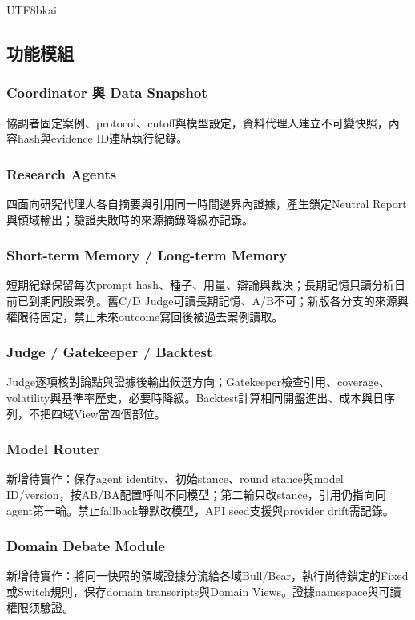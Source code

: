 \documentclass[12pt,a4paper]{article}
\begin{document}
\begin{CJK}{UTF8}{bkai}
\subsection{功能模組}

\subsubsection{Coordinator 與 Data Snapshot}
協調者固定案例、protocol、cutoff與模型設定，資料代理人建立不可變快照，內容hash與evidence ID連結執行紀錄。

\subsubsection{Research Agents}
四面向研究代理人各自摘要與引用同一時間邊界內證據，產生鎖定Neutral Report與領域輸出；驗證失敗時的來源摘錄降級亦記錄。

\subsubsection{Short-term Memory / Long-term Memory}
短期紀錄保留每次prompt hash、種子、用量、辯論與裁決；長期記憶只讀分析日前已到期同股案例。舊C/D Judge可讀長期記憶、A/B不可；新版各分支的來源與權限待固定，禁止未來outcome寫回後被過去案例讀取。

\subsubsection{Judge / Gatekeeper / Backtest}
Judge逐項核對論點與證據後輸出候選方向；Gatekeeper檢查引用、coverage、volatility與基準率歷史，必要時降級。Backtest計算相同開盤進出、成本與日序列，不把四域View當四個部位。

\subsubsection{Model Router}
新增待實作：保存agent identity、初始stance、round stance與model ID/version，按AB/BA配置呼叫不同模型；第二輪只改stance，引用仍指向同agent第一輪。禁止fallback靜默改模型，API seed支援與provider drift需記錄。

\subsubsection{Domain Debate Module}
新增待實作：將同一快照的領域證據分流給各域Bull/Bear，執行尚待鎖定的Fixed或Switch規則，保存domain transcripts與Domain Views。證據namespace與可讀權限须驗證。


\end{CJK}
\end{document}
